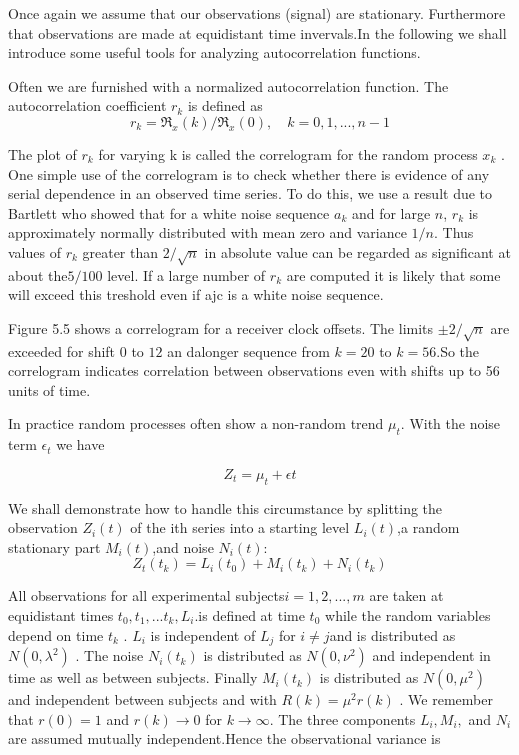 Once again we assume that our observations (signal) are stationary. Furthermore that observations are made at equidistant time invervals.In the following we shall introduce some useful tools for analyzing autocorrelation functions.

 
Often we are furnished with a normalized autocorrelation function. The autocorrelation coefficient $ r_{k} $ is defined as 
\begin{equation}\label{5.35}
r_{k}=\Re_{x}(k)/\Re_{x}(0),\quad k=0,1,...,n-1 
\end{equation}
 

The plot of $ r_{k} $ for varying k is called the correlogram for the random process $ x_{k} $ . One simple use of the correlogram is to check whether there is evidence of any serial dependence in an observed time series. To do this, we use a result due to Bartlett who showed that for a white noise sequence $ a_{k} $ and for large $ n $, $ r_{k}  $ is approximately normally distributed with mean zero and variance $ 1/n $. Thus values of $ r_{k} $  greater than $ 2/\sqrt{n} $ in absolute value can be regarded as significant at about the$  5/100 $ level. If a large number of $ r_{k} $ are computed it is likely that some will exceed this treshold even if ajc is a white noise sequence.

Figure 5.5 shows a correlogram for a receiver clock offsets. The limits $ ± 2/\sqrt{n} $ are exceeded for shift $ 0 $ to $ 12 $ an dalonger sequence from $ k = 20 $ to $  k =56 $.So the correlogram indicates correlation between observations even with shifts up to 56 units of time. 

In practice random processes often show a non-random trend $ \mu_{t} $. With the noise term $ \epsilon_{t} $ we have 

\[ Z_{t}=\mu_{t}+\epsilon{t} \]

We shall demonstrate how to handle this circumstance  by splitting the observation $ Z_{i}(t) $ of the ith series into a starting level $ L_{i}(t) $,a random stationary part $ M_{i}(t) $,and noise $ N_{i}(t) $:
\begin{equation}\label{5.36}
Z_{t}(t_{k})=L_{i}(t_{0})+M_{i}(t_{k})+N_{i}(t_{k})
\end{equation}
 

All observations for all experimental subjects$  i = 1, 2, ...,   m $ are taken at equidistant times $ t_{0},t_{1},...t_{k},L_{i} $.is defined at time $ t_{0} $ while the random variables depend on time $ t_{k} $ . $ L_{i} $ is independent of $ L_{j} $ for $ i\neq j $and is distributed as $ N(0,\lambda^{2}) $ . The noise $ N_{i}(t_{k}) $ is distributed as $ N(0,\nu^{2}) $ and independent in time as well as between subjects. Finally $ M_{i}(t_{k}) $ is distributed as $ N(0,\mu^{2}) $  and independent between subjects and with $ R(k)=\mu^{2}r(k) $ .  We remember that $ r(0) = 1 $ and $ r(k)\rightarrow 0 $ for $ k\rightarrow \infty $. The three components $  L_{i},M_{i}, $ and $ N_{i} $ are assumed mutually independent.Hence the observational variance is 

